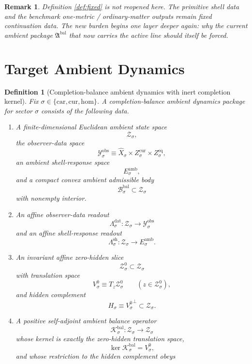 \documentclass[11pt]{article}
\newcommand{\AmbientPackage}{\mathfrak A^{\mathrm{bal}}}
\newcommand{\Car}{\mathrm{car}}
\newcommand{\Cur}{\mathrm{cur}}
\newcommand{\Hom}{\mathrm{hom}}
\newcommand{\VisibleAffine}[1]{\widehat X_{#1}}
\newcommand{\DataSpace}[1]{\mathcal Y_{#1}^{\mathrm{obs}}}
\newcommand{\AmbientTarget}[1]{E_{#1}^{\mathrm{amb}}}
\newcommand{\BalSpace}[1]{\mathcal Z_{#1}}
\newcommand{\BalBody}[1]{\mathcal B_{#1}^{\mathrm{bal}}}
\newcommand{\BalData}[1]{\Lambda_{#1}^{\mathrm{dat}}}
\newcommand{\BalShell}[1]{\Lambda_{#1}^{\mathrm{sh}}}
\newcommand{\ZeroHiddenSlice}[1]{\mathcal Z_{#1}^{0}}
\newcommand{\ZeroHiddenVec}[1]{V_{#1}^{0}}
\newcommand{\BalOp}[1]{\mathcal K_{#1}^{\mathrm{bal}}}
\newcommand{\GapSpace}[1]{H_{#1}}
\newtheorem{definition}{Definition}
\newtheorem{remark}{Remark}
\begin{document}
\begin{remark}
Definition \ref{def:fixed} is not reopened here. The primitive shell data and the benchmark one-metric / ordinary-matter outputs remain fixed continuation data. The new burden begins one layer deeper again: why the current ambient package \(\AmbientPackage\) that now carries the active line should itself be forced.
\end{remark}

\section{Target Ambient Dynamics}

\begin{definition}[Completion-balance ambient dynamics with inert completion kernel]
\label{def:ambient}
Fix \(\sigma\in\{\Car,\Cur,\Hom\}\). A \emph{completion-balance ambient dynamics package} for sector \(\sigma\) consists of the following data.
\begin{enumerate}
    \item A finite-dimensional Euclidean ambient state space
    \[
    \BalSpace{\sigma},
    \]
    the observer-data space
    \[
    \DataSpace{\sigma}
    \equiv
    \VisibleAffine{\sigma}\times Z_{\sigma}^{\mathrm{cur}}\times Z_{\sigma}^{\mathrm{eq}},
    \]
    an ambient shell-response space
    \[
    \AmbientTarget{\sigma},
    \]
    and a compact convex ambient admissible body
    \[
    \BalBody{\sigma}\subset\BalSpace{\sigma}
    \]
    with nonempty interior.
    \item An affine observer-data readout
    \[
    \BalData{\sigma}:\BalSpace{\sigma}\to\DataSpace{\sigma}
    \]
    and an affine shell-response readout
    \[
    \BalShell{\sigma}:\BalSpace{\sigma}\to\AmbientTarget{\sigma}.
    \]
    \item An invariant affine zero-hidden slice
    \[
    \ZeroHiddenSlice{\sigma}\subset\BalSpace{\sigma}
    \]
    with translation space
    \[
    \ZeroHiddenVec{\sigma}\equiv T_{z}\ZeroHiddenSlice{\sigma}
    \qquad
    (z\in\ZeroHiddenSlice{\sigma}),
    \]
    and hidden complement
    \[
    \GapSpace{\sigma}
    \equiv
    {\ZeroHiddenVec{\sigma}}^{\perp}\subset\BalSpace{\sigma}.
    \]
    \item A positive self-adjoint ambient balance operator
    \[
    \BalOp{\sigma}:\BalSpace{\sigma}\to\BalSpace{\sigma}
    \]
    whose kernel is exactly the zero-hidden translation space,
    \[
    \ker\BalOp{\sigma}=\ZeroHiddenVec{\sigma},
    \]
    and whose restriction to the hidden complement obeys

\end{enumerate}
\end{definition}
\end{document}

